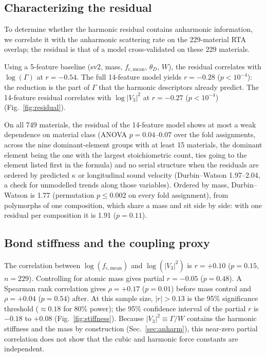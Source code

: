 \documentclass[aps,prm,reprint,onecolumn,groupedaddress]{revtex4-2}
\begin{document}
\subsection{Characterizing the residual}

To determine whether the harmonic residual contains anharmonic information, we correlate it with the anharmonic scattering rate on the 229-material RTA overlap; the residual is that of a model cross-validated on these 229 materials.

Using a 5-feature baseline (sv2, mass, $f_\mathrm{c,mean}$, $\theta_D$, $W$), the residual correlates with $\log(\Gamma)$ at $r = -0.54$. The full 14-feature model yields $r = -0.28$ ($p < 10^{-4}$): the reduction is the part of $\Gamma$ that the harmonic descriptors already predict. The 14-feature residual correlates with $\log|V_3|^2$ at $r = -0.27$ ($p < 10^{-4}$) (Fig.~\ref{fig:residual}).

On all 749 materials, the residual of the 14-feature model shows at most a weak dependence on material class (ANOVA $p = 0.04$--$0.07$ over the fold assignments, across the nine dominant-element groups with at least 15 materials, the dominant element being the one with the largest stoichiometric count, ties going to the element listed first in the formula) and no serial structure when the residuals are ordered by predicted $\kappa$ or longitudinal sound velocity (Durbin--Watson 1.97--2.04, a check for unmodelled trends along those variables). Ordered by mass, Durbin--Watson is 1.77 (permutation $p \le 0.002$ on every fold assignment), from polymorphs of one composition, which share a mass and sit side by side: with one residual per composition it is 1.91 ($p = 0.11$).

\subsection{Bond stiffness and the coupling proxy}
\label{sec:stiffness}

The correlation between $\log(f_\mathrm{c,mean})$ and $\log(|V_3|^2)$ is $r = +0.10$ ($p = 0.15$, $n = 229$). Controlling for atomic mass gives partial $r = -0.05$ ($p = 0.48$). A Spearman rank correlation gives $\rho = +0.17$ ($p = 0.01$) before mass control and $\rho = +0.04$ ($p = 0.54$) after. At this sample size, $|r| > 0.13$ is the 95\% significance threshold ($\approx 0.18$ for 80\% power); the 95\% confidence interval of the partial $r$ is $-0.18$ to $+0.08$ (Fig.~\ref{fig:stiffness}). Because $|V_3|^2 \equiv \Gamma/W$ contains the harmonic stiffness and the mass by construction (Sec.~\ref{sec:anharm}), this near-zero partial correlation does not show that the cubic and harmonic force constants are independent.
\end{document}
